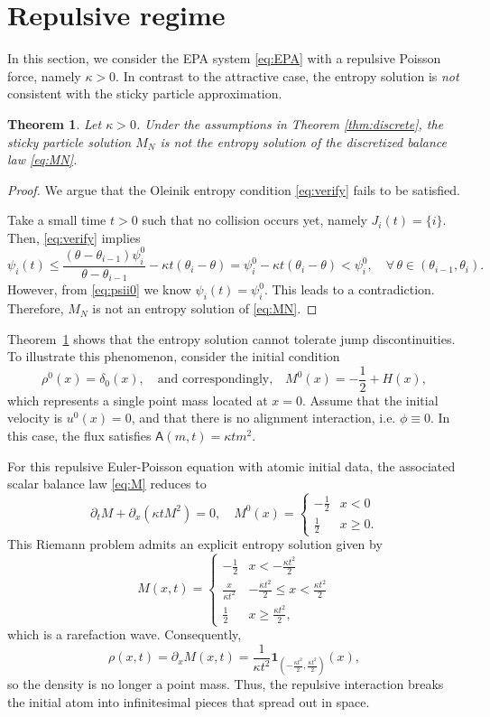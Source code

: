 \documentclass[11pt,reqno]{amsart}
\newtheorem{theorem}{Theorem}[section]
\theoremstyle{definition}
\theoremstyle{remark}
\def\pa{\partial}
\def\A{\mathsf{A}}
\begin{document}
	\section{Repulsive regime}\label{sec:repulsive}
	In this section, we consider the EPA system \eqref{eq:EPA} with a repulsive Poisson force, namely $\kappa>0$. In contrast to the attractive case, the entropy solution is \emph{not} consistent with the sticky particle approximation.
	
	\begin{theorem}\label{thm:discreterepulsive}
		Let $\kappa>0$. Under the assumptions in Theorem \ref{thm:discrete}, the sticky particle solution $M_N$ is not the entropy solution of the discretized balance law \eqref{eq:MN}.	
	\end{theorem}
	\begin{proof}
		We argue that the Oleinik entropy condition \eqref{eq:verify} fails to be satisfied.
		
		Take a small time $t>0$ such that no collision occurs yet, namely $J_i(t)=\{i\}$. Then, \eqref{eq:verify} implies
		\[
		\psi_i(t) \leq \frac{(\theta-\theta_{i-1})\psi_i^0}{\theta - \theta_{i-1}} - \kappa t (\theta_{i}-\theta) = \psi_i^0 - \kappa t (\theta_{i}-\theta) < \psi_i^0,\quad \forall\, \theta\in(\theta_{i-1}, \theta_i).
		\]	
		However, from \eqref{eq:psii0} we know $\psi_i(t) = \psi_i^0$. This leads to a contradiction. Therefore, $M_N$ is not an entropy solution of \eqref{eq:MN}.
	\end{proof}
	
	Theorem~\ref{thm:discreterepulsive} shows that the entropy solution cannot tolerate jump discontinuities. To illustrate this phenomenon, consider the initial condition
	\[
	\rho^0(x) = \delta_0(x),\quad\text{and correspondingly,}\quad M^0(x) = -\frac12+H(x),	
	\]
	which represents a single point mass located at $x=0$. Assume that the initial velocity is $u^0(x)=0$, and that there is no alignment interaction, i.e. $\phi\equiv0$. In this case, the flux satisfies $\A(m,t) = \kappa t m^2$. 
	
	For this repulsive Euler-Poisson equation with atomic initial data, the associated scalar balance law \eqref{eq:M} reduces to
	\[
	\pa_tM+ \pa_x(\kappa t M^2)=0,\quad M^0(x) = 
	\begin{cases}
		-\frac12 & x<0\\ \frac12 & x\geq0.
	\end{cases}
	\]
	This Riemann problem admits an explicit entropy solution given by
	\[
	M(x,t) =  \begin{cases}
		-\frac12 & x<-\frac{\kappa t^2}{2}\\ \frac{x}{\kappa t^2}& -\frac{\kappa t^2}{2} \leq x< \frac{\kappa t^2}{2}\\ \frac12 & x\geq \frac{\kappa t^2}{2},
	\end{cases}
	\]
	which is a rarefaction wave. Consequently,
	\[
	\rho(x,t) = \pa_xM(x,t) = \frac{1}{\kappa t^2} \mathbf{1}_{(-\frac{\kappa t^2}{2},\frac{\kappa t^2}{2})}(x),
	\]
	so the density is no longer a point mass. Thus, the repulsive interaction breaks the initial atom into infinitesimal pieces that spread out in space.
	
\end{document}
